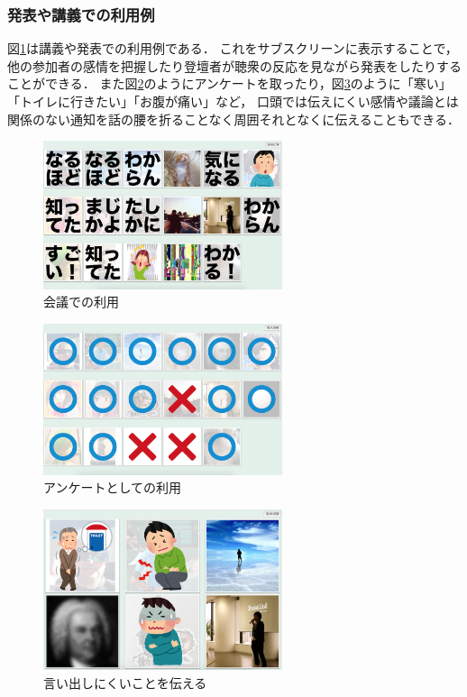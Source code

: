 \subsubsection{発表や講義での利用例}

図\ref{discussion}は講義や発表での利用例である．
これをサブスクリーンに表示することで，他の参加者の感情を把握したり登壇者が聴衆の反応を見ながら発表をしたりすることができる．
また図\ref{vote}のようにアンケートを取ったり，図\ref{rescue}のように「寒い」「トイレに行きたい」「お腹が痛い」など，
口頭では伝えにくい感情や議論とは関係のない通知を話の腰を折ることなく周囲それとなくに伝えることもできる．

\begin{figure}[h]
\centering
\includegraphics[width=7cm]{images/discussion.eps}
\caption{会議での利用}
\label{discussion}
\end{figure}

\begin{figure}[h]
\centering
\includegraphics[width=7cm]{images/vote.eps}
\caption{アンケートとしての利用}
\label{vote}
\end{figure}

\begin{figure}[h]
\centering
\includegraphics[width=7cm]{images/rescue.eps}
\caption{言い出しにくいことを伝える}
\label{rescue}
\end{figure}

